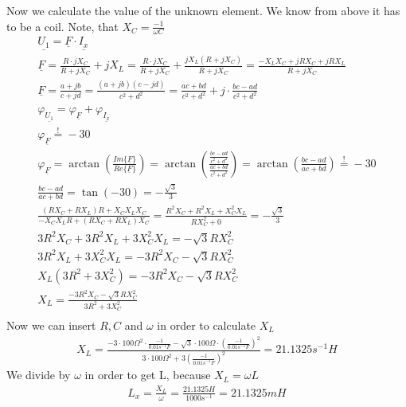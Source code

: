 \documentclass[a4paper]{article}
\begin{document}
Now we calculate the value of the unknown element. We know from above it has to be a coil.
Note, that $X_C = \frac{-1}{\omega C}$
\begin{align*}
	\underline{U_1} = \underline{F} \cdot \underline{I_x}\\
	\underline{F} = \frac{R \cdot jX_C}{R + jX_C} + jX_L =
	\frac{R \cdot jX_C}{R + jX_C} + \frac{jX_L(R+jX_C)}{R + jX_C} = \frac{-X_LX_C + jRX_C + jRX_L}{R + jX_C}\\
	\underline{F} = \frac{a+jb}{c+jd} = \frac{(a+jb)(c-jd)}{c^2+d^2} = \frac{ac+bd}{c^2+d^2} + j\cdot\frac{bc-ad}{c^2+d^2}\\
	\varphi_{\underline{U_1}} = \varphi_{\underline{F}} + \varphi_{\underline{I_x}}\\
	\varphi_{\underline{F}} \overset{!}{=} -30\\
	\varphi_{\underline{F}} = \arctan \left(\frac{Im\{\underline{F}\}}{Re\{\underline{F}\}} \right) =
	\arctan \left(\frac{\frac{bc-ad}{c^2+d^2}}{\frac{ac+bd}{c^2+d^2}} \right) =
	\arctan \left(\frac{bc-ad}{ac+bd} \right) \overset{!}{=} -30\\
	\frac{bc-ad}{ac+bd} = \tan(-30) = -\frac{\sqrt{3}}{3}\\
	\frac{(RX_C+RX_L)R + X_CX_LX_C}{-X_CX_LR + (RX_C + RX_L)X_C} = 
	\frac{R^2X_C + R^2X_L + X_C^2X_L}{RX_C^2 + 0} = -\frac{\sqrt{3}}{3}\\
	3R^2X_C + 3R^2X_L + 3X_C^2X_L = -\sqrt{3}RX_C^2\\
	3R^2X_L + 3X_C^2X_L = -3R^2X_C -\sqrt{3}RX_C^2\\
	X_L(3R^2 + 3X_C^2) = -3R^2X_C -\sqrt{3}RX_C^2\\
	X_L = \frac{-3R^2X_C -\sqrt{3}RX_C^2}{3R^2 + 3X_C^2}\\
\end{align*}
Now we can insert $R, C$ and $\omega$ in order to calculate $X_L$
\begin{align*}
	X_L = \frac{-3 \cdot 100\Omega^2 \cdot \frac{-1}{0.01s^{-1}F} -\sqrt{3} \cdot 100\Omega \cdot \left(\frac{-1}{0.01s^{-1}F}\right)^2}
	{3\cdot 100\Omega^2 + 3\left(\frac{-1}{0.01s^{-1}F}\right)^2} = 21.1325s^{-1}H
\end{align*}
We divide by $\omega$ in order to get L, because $X_L = \omega L$
\begin{align*}
	L_x = \frac{X_L}{\omega} = \frac{21.1325H}{1000s^{-1}} = 21.1325mH
\end{align*}
\newpage
\clearpage
\end{document}
